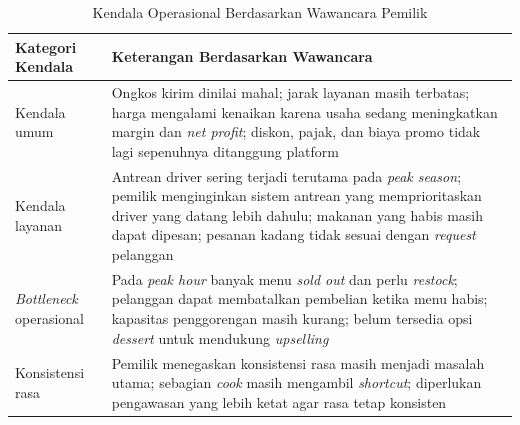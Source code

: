 \begin{table}[h!]
    \centering
    \caption{Kendala Operasional Berdasarkan Wawancara Pemilik}
    \label{tab:kendala_prasurvey2}
    \begin{tabularx}{\textwidth}{lY}
        \toprule
        \textbf{Kategori Kendala}       & \textbf{Keterangan Berdasarkan Wawancara}                                                                                                                                                                                                                         \\
        \midrule
        Kendala umum                    & Ongkos kirim dinilai mahal; jarak layanan masih terbatas; harga mengalami kenaikan karena usaha sedang meningkatkan margin dan \textit{net profit}; diskon, pajak, dan biaya promo tidak lagi sepenuhnya ditanggung platform                                      \\
        Kendala layanan                 & Antrean driver sering terjadi terutama pada \textit{peak season}; pemilik menginginkan sistem antrean yang memprioritaskan driver yang datang lebih dahulu; makanan yang habis masih dapat dipesan; pesanan kadang tidak sesuai dengan \textit{request} pelanggan \\
        \textit{Bottleneck} operasional & Pada \textit{peak hour} banyak menu \textit{sold out} dan perlu \textit{restock}; pelanggan dapat membatalkan pembelian ketika menu habis; kapasitas penggorengan masih kurang; belum tersedia opsi \textit{dessert} untuk mendukung \textit{upselling}           \\
        Konsistensi rasa                & Pemilik menegaskan konsistensi rasa masih menjadi masalah utama; sebagian \textit{cook} masih mengambil \textit{shortcut}; diperlukan pengawasan yang lebih ketat agar rasa tetap konsisten                                                                       \\
        \bottomrule
    \end{tabularx}
\end{table}

